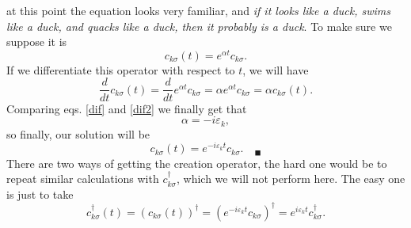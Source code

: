 \begin{questions}
\begin{solution}
  at this point the equation looks very familiar, and \textit{if it looks like a duck, swims like a duck, and quacks like a duck, then it probably is a duck}. To make sure we suppose it is
  \begin{equation}
    c_{k\sigma}(t) = e^{\alpha t} c_{k\sigma}.
  \end{equation}
  If we differentiate this operator with respect to $t$, we will have
  \begin{equation}
    \frac{d}{dt} c_{k\sigma}(t) = \frac{d}{dt}e^{\alpha t} c_{k\sigma} = \alpha e^{\alpha t} c_{k\sigma} =\alpha c_{k\sigma}(t).
    \label{dif2}
  \end{equation}
  Comparing eqs. \ref{dif} and \ref{dif2} we finally get that
  \begin{equation}
    \alpha = -i \varepsilon_k,
  \end{equation}
  so finally, our solution will be
  \begin{equation}
    c_{k\sigma}(t) = e^{-i \varepsilon_k t} c_{k\sigma}. \quad _\blacksquare
  \end{equation}
  There are two ways of getting the creation operator, the hard one would be to repeat similar calculations with $c_{k\sigma}^\dagger$, which we will not perform here. The easy one is just to take
  \begin{equation}
    c_{k\sigma}^\dagger(t) = (c_{k\sigma}(t))^\dagger = (e^{-i \varepsilon_k t} c_{k\sigma})^\dagger = e^{i \varepsilon_k t} c_{k\sigma}^\dagger.
  \end{equation}
\end{solution}
\end{questions}


%
%
